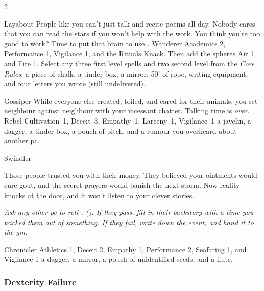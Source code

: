 \begin{multicols}{2}
\begin{itemize}
    {Layabout}%
    {
      People like you can't just talk and recite poems all day.
      Nobody cares that you can read the stars if you won't help with the work.
      You think you're too good to work?
      Time to put that brain to use\ldots
    }%
    {Wanderer}%
    {%
      Academics 2, Performance 1, Vigilance 1, and the Rituals Knack.
    Then add the \glspl{sphere} Air 1, and Fire 1.
    Select any three first level spells and two second level from the \textit{Core Rules}\iftoggle{core}{, pages \pageref{fireSpells} and \pageref{lightSpells}}{}.
    }%
    {
      a piece of chalk, a tinder-box, a mirror, 50' of rope, writing equipment, and four letters you wrote (still undelivered).
    }%

    {Gossiper}%
    {
      While everyone else created, toiled, and cared for their animals, you set neighbour against neighbour with your incessant chatter.
      Talking time is \emph{over}.
    }%
    {Rebel}%
    {Cultivation~1, Deceit~3, Empathy~1, Larceny~1, Vigilance~1}%
    {a javelin, a dagger, a tinder-box, a pouch of pitch,%
      and a rumour you overheard about another \gls{pc}.}%

    {Swindler}%
    {
      Those people trusted you with their money.
      They believed your ointments would cure gout, and the secret prayers would banish the next storm.
      Now reality knocks at the door, and it won't listen to your clever stories.

      \textit{Ask any other \gls{pc} to roll , (\tn[8]).
      If they pass, fill in their backstory with a time you tricked them out of something.
      If they fail, write down the event, and hand it to the \gls{gm}.}
    }%
    {Chronicler}%
    {Athletics 1, Deceit 2, Empathy 1, Performance 2, Seafaring 1, and Vigilance 1}%
    {
      a dagger, a mirror, a pouch of unidentified seeds, and a flute.
    }%

\end{itemize}

\null


\subsubsection{Dexterity Failure}


\end{multicols}
